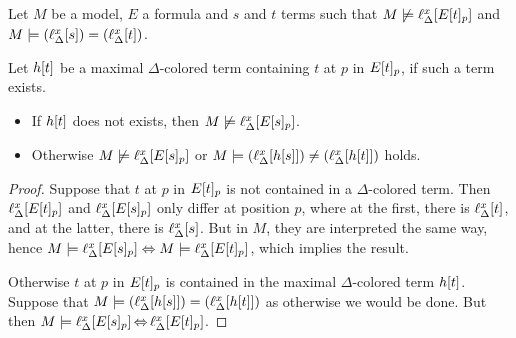 \documentclass[,%
	paper=a4,%
	DIV14, 
	liststotoc,
	bibtotoc,
	draft=false,%
	numbers=noendperiod
]{scrartcl}
\newcommand{\lif}[1]{\lift{\Delta}{#1}{x}}
\begin{document}
\begin{lemma}
	\label{aga5tg5ba}
	Let $M$ be a model, $E$ a formula and $s$ and $t$ terms such that
	$M\notentails \lif{E\occurat{t}{p}}$ 
	and
	$M \entails (\lif{s}) = (\lif{t})$.

	Let $h[t]$ be a maximal $\Delta$-colored term containing $t$ at $p$ in $E{[t]_{p}}$, if such a term exists.
\begin{itemize}
\item If $h[t]$ does not exists, then
		$M\notentails \lif{E\occurat{s}{p}}$.
\item Otherwise
		$M\notentails \lif{E\occurat{s}{p}}$
	or $M\entails (\lif{h\occur{s}}) \neq (\lif{h\occur{t}})$ holds.
\end{itemize}
\end{lemma}
\begin{proof} 
	Suppose that $t$ at $p$ in $E{[t]_{p}}$ is not contained in a $\Delta$-colored term.
	Then $\lif{E\occurat{t}{p}}$ and $\lif{E\occurat{s}{p}}$ only differ at position $p$, where at the first, there is $\lif{t}$, and at the latter, there is $\lif{s}$. But in $M$, they are interpreted the same way, hence $M\entails \lif{E\occurat{s}{p}} \spas\semiff M \entails \lif{E\occurat{t}{p}}$, which implies the result.

	Otherwise $t$ at $p$ in $E{[t]_{p}}$ is contained in the maximal $\Delta$-colored term $h[t]$.
	Suppose that $M\entails (\lif{h\occur{s}})  = (\lif{h\occur{t}})$ as otherwise we would be done.
	But then $M \entails \lif{E\occurat{s}{p}} \semiff{} \lif{E\occurat{t}{p}}$.
\end{proof} 
\end{document}

